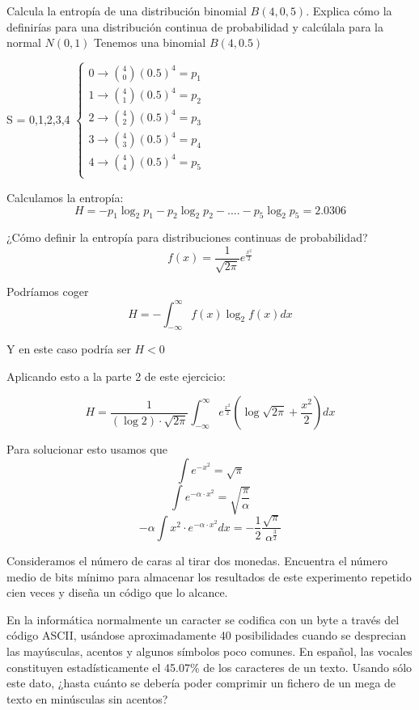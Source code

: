 \begin{problem}[4]
	Calcula la entropía de una distribución binomial $B(4,0,5)$. Explica cómo la definirías para una distribución continua de probabilidad y calcúlala para la normal $N(0,1)$
	\solution
	Tenemos una binomial $B (4, 0.5)$

	S = {0,1,2,3,4}
	$\begin{cases}
	0 \rightarrow {4 \choose 0} (0.5)^4 = p_1 \\
	1 \rightarrow {4 \choose 1} (0.5)^4 = p_2 \\
	2 \rightarrow {4 \choose 2} (0.5)^4 = p_3 \\
	3 \rightarrow {4 \choose 3} (0.5)^4 = p_4 \\
	4 \rightarrow {4 \choose 4} (0.5)^4 = p_5 \\
	\end{cases}$

	Calculamos la entropía:
	$$H = -p_1 \log_2 p_1 -p_2 \log_2 p_2 - ....  -p_5 \log_2 p_5 = 2.0306 $$

	¿Cómo definir la entropía para distribuciones continuas de probabilidad?
	$$f(x) = \frac{1}{\sqrt{2\pi}} e^{\frac{x^2}{2}}$$

	Podríamos coger
	$$H = -\int_{-\infty}^{\infty} f(x) \log_2 f(x) dx$$

	Y en este caso podría ser $H<0$

	Aplicando esto a la parte 2 de este ejercicio:

	$$H = \frac{1}{(\log 2) \cdot \sqrt{2\pi}} \int_{-\infty}^{\infty} e^{\frac{x^2}{2}} (\log \sqrt{2\pi} + \frac{x^2}{2}) dx$$

	Para solucionar esto usamos que
	$$\int e^{-x^2} = \sqrt{\pi}$$
	$$\int e^{-\alpha \cdot x^2} = \sqrt{\frac{\pi}{\alpha}}$$
	$$- \alpha\int x^2\cdot  e^{-\alpha \cdot x^2} dx = -\frac{1}{2}\frac{\sqrt{\pi}}{\alpha^{\frac{3}{2}}}$$
\end{problem}

\begin{problem}[5]
Consideramos el número de caras al tirar dos monedas. Encuentra el número medio de bits mínimo para almacenar los resultados de este experimento repetido cien veces y diseña un código que lo alcance.
\solution
\end{problem}

\begin{problem}[6]
En la informática normalmente un caracter se codifica con un byte a través del código ASCII, usándose aproximadamente 40 posibilidades cuando se desprecian las mayúsculas, acentos y algunos símbolos poco comunes. En español, las vocales constituyen estadísticamente el 45.07\% de los caracteres de un texto. Usando sólo este dato, ¿hasta cuánto se debería poder comprimir un fichero de un mega de texto en minúsculas sin acentos?
\solution
\end{problem}

